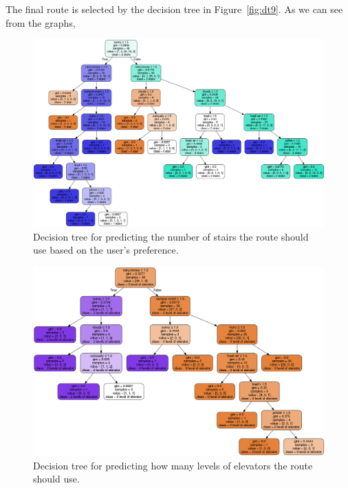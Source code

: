 \documentclass{sigchi}
\begin{document}
The final route is selected by the decision tree in Figure~\ref{fig:dt9}. As we can see from the graphs, 

\begin{figure}[!h]
\centering
\includegraphics[width=2.0\columnwidth]{pics/decisionTree_1.png}
\caption{Decision tree for predicting the number of stairs the route should use based on the user’s preference.}
\label{fig:dt1}
\end{figure}

\begin{figure}[!h]
\centering
\includegraphics[width=2.0\columnwidth]{pics/decisionTree_2.png}
\caption{Decision tree for predicting how many levels of elevators the route should use.}
\label{fig:dt2}
\end{figure}
\end{document}
